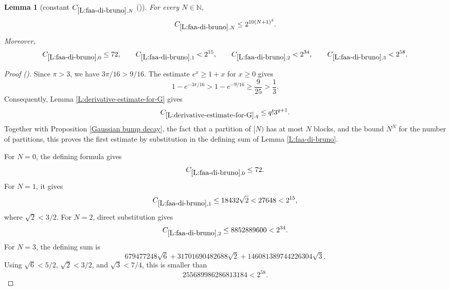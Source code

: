 \documentclass[12pt,reqno]{amsart}
\newcommand{\auto}{{({\tiny\faCar})}}
\theoremstyle{plain}
\newtheorem{lemma}[theorem]{Lemma}
\numberwithin{equation}{section}
\theoremstyle{remark}
\newcommand{\uses}[1]{}
\newcommand{\usesdefs}[1]{}
\newcommand{\N}{{\mathbb N}}
\begin{document}
\begin{lemma}[constant $C_{\ref{L:faa-di-bruno},N}$ \auto]\label{constant faa di bruno}\uses{L:faa-di-bruno,L:derivative-estimate-for-G,Gaussian bump decay}\usesdefs{}
For every $N\in\N$,
\begin{equation}\label{constant faa di bruno bound}
C_{\ref{L:faa-di-bruno},N}\le2^{10(N+1)^3}.
\end{equation}
Moreover,
\begin{equation}\label{auto:constant-faa-di-bruno-small}
C_{\ref{L:faa-di-bruno},0}\le72,\qquad
C_{\ref{L:faa-di-bruno},1}<2^{15},\qquad
C_{\ref{L:faa-di-bruno},2}<2^{34},\qquad
C_{\ref{L:faa-di-bruno},3}<2^{58}.
\end{equation}
\end{lemma}
\begin{proof}[Proof \auto]
Since $\pi>3$, we have $3\pi/16>9/16$. The estimate $e^x\ge1+x$ for $x\ge0$ gives
\[
1-e^{-3\pi/16}>1-e^{-9/16}\ge\frac{9}{25}>\frac13.
\]
Consequently, Lemma \ref{L:derivative-estimate-for-G} gives
\[
C_{\ref{L:derivative-estimate-for-G},q}
\le q!3^{q+1}.
\]
Together with Proposition \ref{Gaussian bump decay}, the fact that a partition of $[N)$ has at most $N$ blocks, and the bound $N^N$ for the number of partitions, this proves the first estimate by substitution in the defining sum of Lemma \ref{L:faa-di-bruno}.

For $N=0$, the defining formula gives
\[
C_{\ref{L:faa-di-bruno},0}\le72.
\]
For $N=1$, it gives
\[
C_{\ref{L:faa-di-bruno},1}
\le18432\sqrt2
<27648
<2^{15},
\]
where $\sqrt2<3/2$. For $N=2$, direct substitution gives
\[
C_{\ref{L:faa-di-bruno},2}
\le8852889600
<2^{34}.
\]
For $N=3$, the defining sum is
\[
679477248\sqrt6
+31701690482688\sqrt2
+146081389744226304\sqrt3.
\]
Using $\sqrt6<5/2$, $\sqrt2<3/2$, and $\sqrt3<7/4$, this is smaller than
\[
255689986286813184<2^{58}.
\]
\end{proof}
\end{document}

